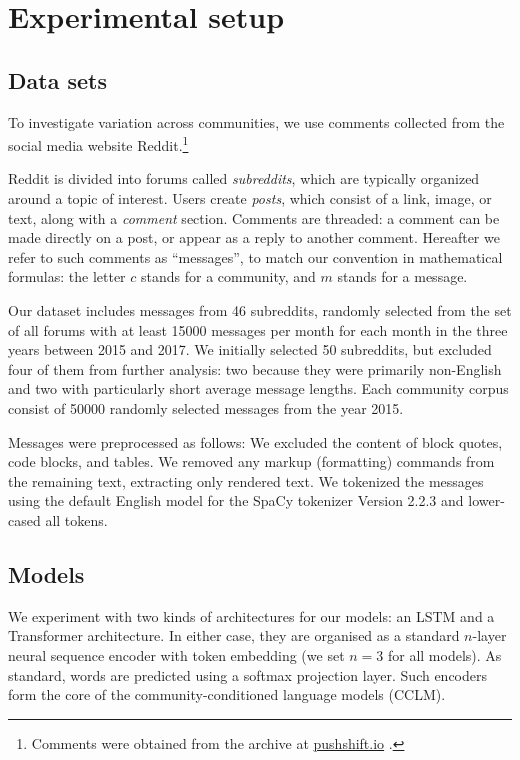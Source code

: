 \documentclass[11pt,a4paper]{article}
\newcommand\jp[1]{\todo[backgroundcolor=blue!10]{JP: #1}}
\begin{document}
\section{Experimental setup}

\subsection{Data sets}

To investigate variation across communities, we use comments collected
from the social media website Reddit.\footnote{Comments were obtained
  from the archive at \href{https://pushshift.io/}{pushshift.io}
  \cite{Baumgartner2020}.} 

Reddit is divided into forums called \textit{subreddits}, 
which are typically organized around a topic of interest. 
Users create \textit{posts}, which consist of a link, image, 
or text, along with a \emph{comment} section. 
Comments are threaded: a comment can be made directly on a post,
or appear as a reply to another comment.
%
Hereafter we refer to such comments as ``messages'', to match our
convention in mathematical formulas: the letter $c$ stands for a
community, and $m$ stands for a message.

Our dataset includes messages from \num{46} subreddits, 
randomly selected from the set of all forums 
with at least \num{15000} messages per month for each month
in the three years between 2015 and 2017. 
We initially selected \num{50} subreddits, 
but excluded four of them from further analysis: 
two because they were primarily non-English and two with particularly\jp{quantify?} short average message lengths.
Each community corpus consist of \num{50000} randomly selected messages from the year 2015.

Messages were preprocessed as follows: 
We excluded the content of block quotes, code blocks, and tables.
We removed any markup (formatting) commands from the remaining text, extracting only rendered text.
We tokenized the messages using the default English model for the SpaCy tokenizer Version 2.2.3 \citep{Honnibal2017}
and lower-cased all tokens.

\subsection{Models}

We experiment with two kinds of architectures for our models: an LSTM
and a Transformer architecture\jp{citations}.  In either case, they
are organised as a standard $n$-layer neural sequence encoder with
token embedding (we set $n=3$ for all models). As standard, words are predicted
using a softmax projection layer.
Such encoders form the
core of the community-conditioned language models (CCLM).
\end{document}

